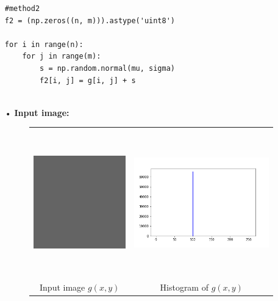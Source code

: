 \documentclass[12pt,a4paper]{article}
\begin{document}
\begin{enumerate}
\begin{lstlisting}
#method2
f2 = (np.zeros((n, m))).astype('uint8')

for i in range(n):
    for j in range(m):
        s = np.random.normal(mu, sigma)
        f2[i, j] = g[i, j] + s


\end{lstlisting}

\item[•]
{\bf Input image:}\\
\begin{figure}[h]
\hspace*{1em}
\begin{tabular}{cc}
\includegraphics[height=2.5in]{image_g.jpg}&
\includegraphics[height=2.5in]{g_histogram.png}\\
Input image $g(x, y)$ & Histogram of $g(x, y)$
\end{tabular}
\end{figure}


\end{enumerate}
\end{document}
